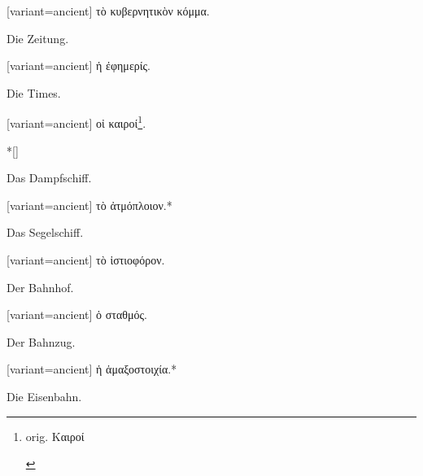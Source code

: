 \begin{greek}[variant=ancient]%
τὸ κυβερνητικὸν κόμμα.

\end{greek}%
\switchcolumn*

Die Zeitung.

\switchcolumn

\begin{greek}[variant=ancient]%
ἡ ἐφημερίς.

\end{greek}%
\switchcolumn*

Die Times.

\switchcolumn

\begin{greek}[variant=ancient]%
οἰ καιροί\footnote{\begin{latin}%
orig. \textgreek[variant=ancient]{Καιροί}\end{latin}%
}.

\end{greek}%
\switchcolumn[0]*[\StarOrnament]

Das Dampf\textcompwordmark{}schiff. 

\switchcolumn

\begin{greek}[variant=ancient]%
τὸ ἀτμόπλοιον.{*}

\end{greek}%
\switchcolumn*

Das Segelschiff.

\switchcolumn

\begin{greek}[variant=ancient]%
τὸ ἱστιοφόρον.

\end{greek}%
\switchcolumn*

Der Bahnhof.

\switchcolumn

\begin{greek}[variant=ancient]%
ὁ σταθμός.

\end{greek}%
\switchcolumn*

Der Bahnzug.

\switchcolumn

\begin{greek}[variant=ancient]%
ἡ ἁμαξοστοιχία.{*}

\end{greek}%
\switchcolumn*

Die Eisenbahn.

\switchcolumn

